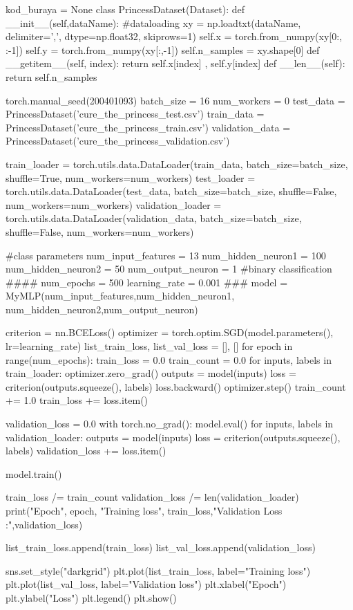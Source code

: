 \documentclass[11pt]{article}
\begin{document}
\begin{python}
kod_buraya = None
class PrincessDataset(Dataset):
    def __init__(self,dataName):
        #dataloading
        xy = np.loadtxt(dataName, delimiter=',', dtype=np.float32, skiprows=1)
        self.x = torch.from_numpy(xy[0:, :-1])
        self.y = torch.from_numpy(xy[:,-1])
        self.n_samples = xy.shape[0]
    def __getitem__(self, index):
        return self.x[index] , self.y[index]
    def __len__(self):
        return self.n_samples

torch.manual_seed(200401093)
batch_size = 16
num_workers = 0
test_data = PrincessDataset('cure_the_princess_test.csv')
train_data = PrincessDataset('cure_the_princess_train.csv')
validation_data = PrincessDataset('cure_the_princess_validation.csv')

train_loader = torch.utils.data.DataLoader(train_data, batch_size=batch_size, shuffle=True, num_workers=num_workers)
test_loader = torch.utils.data.DataLoader(test_data, batch_size=batch_size, shuffle=False, num_workers=num_workers)
validation_loader = torch.utils.data.DataLoader(validation_data, batch_size=batch_size, shuffle=False, num_workers=num_workers)

#class parameters
num_input_features = 13
num_hidden_neuron1 = 100
num_hidden_neuron2 = 50
num_output_neuron = 1 #binary classification
####
num_epochs = 500
learning_rate = 0.001
###
model = MyMLP(num_input_features,num_hidden_neuron1, num_hidden_neuron2,num_output_neuron)

criterion = nn.BCELoss()
optimizer = torch.optim.SGD(model.parameters(), lr=learning_rate)
list_train_loss, list_val_loss = [], []
for epoch in range(num_epochs):
    train_loss = 0.0
    train_count = 0.0
    for inputs, labels in train_loader:
        optimizer.zero_grad()
        outputs = model(inputs)
        loss = criterion(outputs.squeeze(), labels)
        loss.backward()
        optimizer.step()
        train_count += 1.0
        train_loss += loss.item()

    validation_loss = 0.0
    with torch.no_grad():
        model.eval()
        for inputs, labels in validation_loader:
            outputs = model(inputs)
            loss = criterion(outputs.squeeze(), labels)
            validation_loss += loss.item()

    model.train()

    train_loss /= train_count
    validation_loss /= len(validation_loader)
    print("Epoch", epoch, "Training loss", train_loss,"Validation Loss :",validation_loss)

    list_train_loss.append(train_loss)
    list_val_loss.append(validation_loss)
                   

sns.set_style("darkgrid")
plt.plot(list_train_loss, label="Training loss")
plt.plot(list_val_loss, label="Validation loss")
plt.xlabel("Epoch")
plt.ylabel("Loss")
plt.legend()
plt.show()
\end{python}
\end{document}
